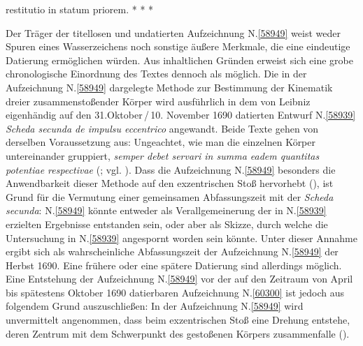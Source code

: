 restitutio in statum priorem.%
%
%
\pend%
\newpage%
\pstart%
\noindent%
\centering%
*     *     *
\pend%
%
\frenchspacing%
\vspace{4.0em}%
\begin{ledgroup}%
\footnotesize%
\pstart%
\noindent%
%
Der Träger der titellosen und undatierten Aufzeichnung N.\;\ref{58949} weist weder Spuren eines Wasserzeichens noch sonstige äußere Merkmale, die eine eindeutige Datierung ermöglichen würden.
Aus inhaltlichen Gründen erweist sich eine grobe chronologische Einordnung des Textes dennoch als möglich.
\pend%
\pstart%
Die in der Aufzeichnung N.\;\ref{58949} dargelegte Methode zur Bestimmung der Kinematik dreier zusammenstoßender Körper wird ausführlich in dem von Leibniz eigenhändig auf den 31.\;Oktober\,/\,10. November 1690 datierten Entwurf N.\;\ref{58939} \textit{Scheda secunda de impulsu eccentrico} angewandt.
Beide Texte gehen von derselben Voraussetzung aus:
Ungeachtet, wie man die einzelnen Körper untereinander gruppiert, \textit{semper debet servari in summa eadem quantitas potentiae respectivae} (; vgl. ).
Dass die Aufzeichnung N.\;\ref{58949} besonders die Anwendbarkeit dieser Methode auf den exzentrischen Stoß hervorhebt (), ist Grund für die Vermutung einer gemeinsamen Abfassungszeit mit der \textit{Scheda secunda}: %
N.\;\ref{58949} könnte entweder als Verallgemeinerung der in N.\;\ref{58939} erzielten Ergebnisse entstanden sein, oder aber als Skizze, durch welche die Untersuchung in N.\;\ref{58939} angespornt worden sein könnte.
Unter dieser Annahme ergibt sich als wahrscheinliche Abfassungszeit der Aufzeichnung N.\;\ref{58949} der Herbst 1690. %
Eine frühere oder eine spätere Datierung sind allerdings möglich.
\pend%
\pstart%
Eine Entstehung der Aufzeichnung N.\;\ref{58949} vor der auf den Zeitraum von April bis spätestens Oktober 1690 datierbaren Aufzeichnung N.\;\ref{60300} ist jedoch aus folgendem Grund auszuschließen:
In der Aufzeichnung N.\;\ref{58949} wird unvermittelt angenommen, dass beim exzentrischen Stoß eine Drehung entstehe, deren Zentrum %
mit dem Schwerpunkt des gestoßenen Körpers zusammenfalle ().

\end{ledgroup}
